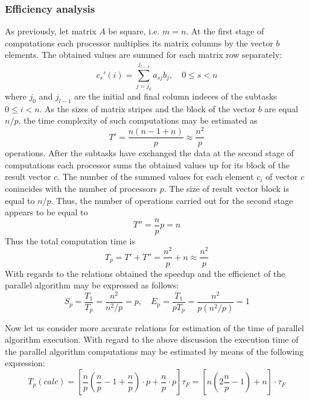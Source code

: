 \subsubsection{Efficiency analysis} %
\label{ssub:efficienct_analysis}
As previously, let matrix $A$ be square, i.e. $m=n$. At the first stage of computations each processor multiplies its matrix columns by the vector $b$ elements. The obtained values are summed for each matrix row separately:
\begin{equation}
  c_s'(i) = \sum_{j=j_0}^{j_{l-1}} a_{sj}b_j, \quad 0\leq s < n
\end{equation}
where $j_0$ and $j_{l-1}$ are the initial and final column indeces of the subtasks $0\leq i <n$. As the sizes of matrix stripes and the block of the vector $b$ are equal $n/p$, the time complexity of such computations may be estimated as
\begin{equation}
  T' = \frac{n(n-1+n)}{p} \approx \frac{n^2}{p}
\end{equation}
operations. After the subtasks have exchanged the data at the second stage of computations each processor sums the obtained values up for its block of the result vector $c$. The number of the summed values for each element $c_i$ of vector $c$ conincides with the number of processors $p$. The size of result vector block is equal to $n/p$. Thus, the number of operations carried out for the second stage appears to be equal to
\begin{equation}
  T'' = \frac{n}{p} p = n
\end{equation}
Thus the total computation time is
\begin{equation}
  T_p = T' + T'' = \frac{n^2}{p} + n \approx \frac{n^2}{p}
\end{equation}
With regards to the relations obtained the speedup and the efficienct of the parallel algorithm may be expressed as follows:
\begin{equation}
  S_p = \frac{T_1}{T_p} = \frac{n^2}{n^2/p} = p, \quad E_p = \frac{T_1}{pT_p} = \frac{n^2}{p(n^2/p)} = 1
\end{equation}

Now let us consider more accurate relations for estimation of the time of parallel algorithm execution. With regard to the above discussion the execution time of the parallel algorithm computations may be estimated by means of the following expression:
\begin{equation}
  T_p (calc) = \left[ \frac{n}{p} \left(\frac{n}{p} - 1 + \frac{n}{p} \right) \cdot p + \frac{n}{p} \cdot p \right]\tau_F
   = \left[ n \left( 2 \frac{n}{p} -1 \right) + n \right] \cdot \tau_F
\end{equation}

